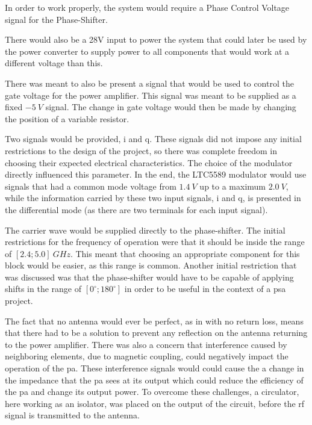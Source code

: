 \par In order to work properly, the system would require a Phase Control Voltage signal for the Phase-Shifter. 

\par There would also be a 28V input to power the system that could later be used by the power converter to supply power to all components that would work at a different voltage than this. 

\par There was meant to also be present a signal that would be used to control the gate voltage for the power amplifier. This signal was meant to be supplied as a fixed $-5 \:\si{V}$ signal. The change in gate voltage would then be made by changing the position of a variable resistor.

\par Two signals would be provided, \acl{i} and \acl{q}. These signals did not impose any initial restrictions to the design of the project, so there was complete freedom in choosing their expected electrical characteristics. The choice of the modulator directly influenced this parameter. In the end, the LTC5589 modulator would use signals that had a common mode voltage from $1.4 \:\si{V}$ up to a maximum $2.0 \:\si{V}$, while the information carried by these two input signals, \ac{i} and \ac{q}, is presented in the differential mode (as there are two terminals for each input signal).

\par The carrier wave would be supplied directly to the phase-shifter. The initial restrictions for the frequency of operation were that it should be inside the range of $[2.4; 5.0] \:\si{GHz}$. This meant that choosing an appropriate component for this block would be easier, as this range is common. Another initial restriction that was discussed was that the phase-shifter would have to be capable of applying shifts in the range of $[0^{\circ}; 180^{\circ}]$ in order to be useful in the context of a \ac{psa} project.

\par The fact that no antenna would ever be perfect, as in with no return loss, means that there had to be a solution to prevent any reflection on the antenna returning to the power amplifier. There was also a concern that interference caused by neighboring elements, due to magnetic coupling, could negatively impact the operation of the \ac{pa}. These interference signals would could cause the a change in the impedance that the \ac{pa} sees at its output which could reduce the efficiency of the \ac{pa} and change its output power. To overcome these challenges, a circulator, here working as an isolator,  was placed on the output of the circuit, before the \ac{rf} signal is transmitted to the antenna.

